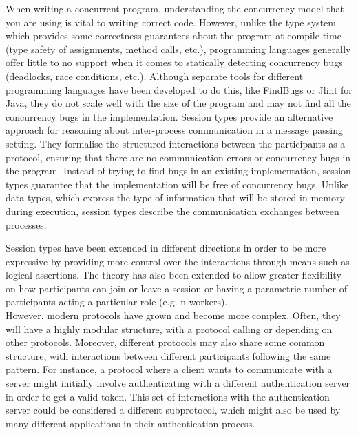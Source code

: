 \documentclass[12pt,twoside]{report}
\newcommand{\comment}[1]{}
\begin{document}
When writing a concurrent program, understanding the concurrency model that you are using is vital to writing correct code. However, unlike the type system which provides some correctness guarantees about the program at compile time (type safety of assignments, method calls, etc.), programming languages generally offer little to no support when it comes to statically detecting concurrency bugs (deadlocks, race conditions, etc.). Although separate tools for different programming languages have been developed to do this, like FindBugs\cite{FindBugs} or Jlint\cite{JLint} for Java\comment{How Good is Static Analysis at Finding Concurrency Bugs?/Find Bugs paper and chord paper}, they do not scale well with the size of the program and may not find all the concurrency bugs in the implementation\cite{ConcurrencyTools}. Session types\cite{binarysessiontypes1} provide an alternative approach for reasoning about inter-process communication in a message passing setting. They formalise the structured interactions between the participants as a protocol, ensuring that there are no communication errors or concurrency bugs in the program. Instead of trying to find bugs in an existing implementation, session types guarantee that the implementation will be free of concurrency bugs. Unlike data types, which express the type of information that will be stored in memory during execution, session types describe the communication exchanges between processes.

Session types have been extended in different directions in order to be more expressive by providing more control over the interactions through means such as logical assertions\cite{logicaassertions}. The theory has also been extended to allow greater flexibility on how participants can join or leave a session\cite{multirolesessiontypes} or having a parametric number of participants acting a particular role (e.g. n workers)\cite{parametrictypes}.\\

However, modern protocols have grown and become more complex. Often, they will have a highly modular structure, with a protocol calling or depending on other protocols. Moreover, different protocols may also share some common structure, with interactions between different participants following the same pattern. For instance, a protocol where a client wants to communicate with a server might initially involve authenticating with a different authentication server in order to get a valid token. This set of interactions with the authentication server could be considered a different subprotocol, which might also be used by many different applications in their authentication process. \\
\end{document}

